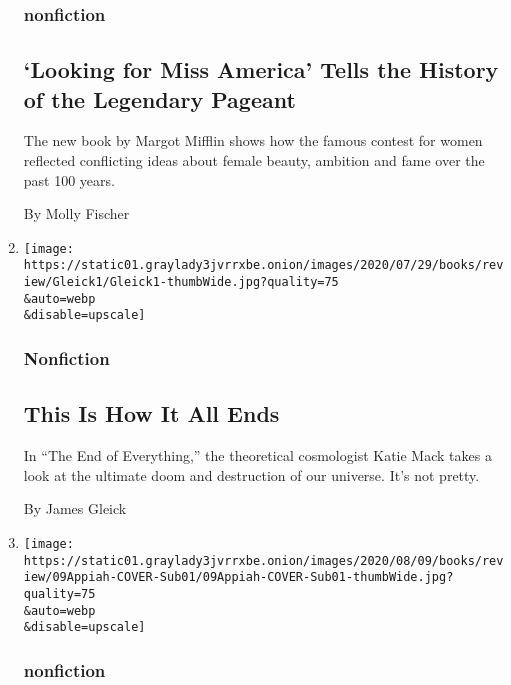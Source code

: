 \begin{enumerate}
  \hypertarget{nonfiction-2}{%
  \subsubsection{nonfiction}\label{nonfiction-2}}

  \hypertarget{looking-for-miss-america-tells-the-history-of-the-legendary-pageant}{%
  \subsection{`Looking for Miss America' Tells the History of the
  Legendary
  Pageant}\label{looking-for-miss-america-tells-the-history-of-the-legendary-pageant}}

  The new book by Margot Mifflin shows how the famous contest for women
  reflected conflicting ideas about female beauty, ambition and fame
  over the past 100 years.

  By Molly Fischer
\item
  \href{/2020/08/04/books/review/the-end-of-everything-katie-mack.html}{}

  \texttt{[image: https://static01.graylady3jvrrxbe.onion/images/2020/07/29/books/review/Gleick1/Gleick1-thumbWide.jpg?quality=75\\\&auto=webp\\\&disable=upscale]}

  \hypertarget{nonfiction-3}{%
  \subsubsection{Nonfiction}\label{nonfiction-3}}

  \hypertarget{this-is-how-it-all-ends}{%
  \subsection{This Is How It All Ends}\label{this-is-how-it-all-ends}}

  In ``The End of Everything,'' the theoretical cosmologist Katie Mack
  takes a look at the ultimate doom and destruction of our universe.
  It's not pretty.

  By James Gleick
\item
  \href{/2020/08/04/books/review/caste-isabel-wilkerson.html}{}

  \texttt{[image: https://static01.graylady3jvrrxbe.onion/images/2020/08/09/books/review/09Appiah-COVER-Sub01/09Appiah-COVER-Sub01-thumbWide.jpg?quality=75\\\&auto=webp\\\&disable=upscale]}

  \hypertarget{nonfiction-4}{%
  \subsubsection{nonfiction}\label{nonfiction-4}}


\end{enumerate}
